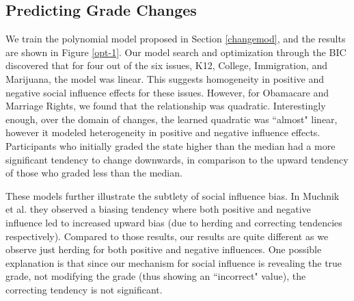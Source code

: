 \subsection{Predicting Grade Changes}
We train the polynomial model proposed in Section \ref{changemod}, and the results are shown in Figure \ref{opt-1}.
Our model search and optimization through the BIC discovered that for four out of the six issues, K12, College, Immigration, and Marijuana, the model was linear.
This suggests homogeneity in positive and negative social influence effects for these issues.
However, for Obamacare and Marriage Rights, we found that the relationship was quadratic.
Interestingly enough, over the domain of changes, the learned quadratic was ``almost" linear, however it modeled heterogeneity in positive and negative influence effects.
Participants who initially graded the state higher than the median had a more significant tendency to change downwards, in comparison to the upward tendency of those who graded less than the median.

These models further illustrate the subtlety of social influence bias. 
In Muchnik et al. they observed a biasing tendency where both positive and negative influence led to increased upward bias (due to herding and correcting tendencies respectively).
Compared to those results, our results are quite different as we observe just herding for both positive and negative influences.
One possible explanation is that since our mechanism for social influence is revealing the true grade, not modifying the grade (thus showing an ``incorrect" value), the correcting tendency is not significant.





